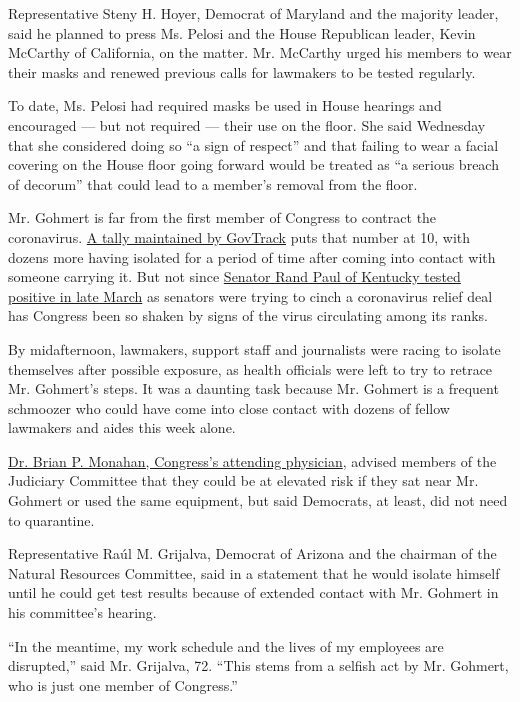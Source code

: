 Representative Steny H. Hoyer, Democrat of Maryland and the majority
leader, said he planned to press Ms. Pelosi and the House Republican
leader, Kevin McCarthy of California, on the matter. Mr. McCarthy urged
his members to wear their masks and renewed previous calls for lawmakers
to be tested regularly.

To date, Ms. Pelosi had required masks be used in House hearings and
encouraged --- but not required --- their use on the floor. She said
Wednesday that she considered doing so ``a sign of respect'' and that
failing to wear a facial covering on the House floor going forward would
be treated as ``a serious breach of decorum'' that could lead to a
member's removal from the floor.

Mr. Gohmert is far from the first member of Congress to contract the
coronavirus. \href{https://www.govtrack.us/covid-19\#legislators}{A
tally maintained by GovTrack} puts that number at 10, with dozens more
having isolated for a period of time after coming into contact with
someone carrying it. But not since
\href{https://www.nytimes3xbfgragh.onion/2020/03/22/us/politics/coronavirus-rand-paul.html}{Senator
Rand Paul of Kentucky tested positive in late March} as senators were
trying to cinch a coronavirus relief deal has Congress been so shaken by
signs of the virus circulating among its ranks.

By midafternoon, lawmakers, support staff and journalists were racing to
isolate themselves after possible exposure, as health officials were
left to try to retrace Mr. Gohmert's steps. It was a daunting task
because Mr. Gohmert is a frequent schmoozer who could have come into
close contact with dozens of fellow lawmakers and aides this week alone.

\href{https://www.nytimes3xbfgragh.onion/2020/05/16/us/politics/congress-doctor-virus-brian-monahan.html}{Dr.
Brian P. Monahan, Congress's attending physician}, advised members of
the Judiciary Committee that they could be at elevated risk if they sat
near Mr. Gohmert or used the same equipment, but said Democrats, at
least, did not need to quarantine.

Representative Raúl M. Grijalva, Democrat of Arizona and the chairman of
the Natural Resources Committee, said in a statement that he would
isolate himself until he could get test results because of extended
contact with Mr. Gohmert in his committee's hearing.

``In the meantime, my work schedule and the lives of my employees are
disrupted,'' said Mr. Grijalva, 72. ``This stems from a selfish act by
Mr. Gohmert, who is just one member of Congress.''

